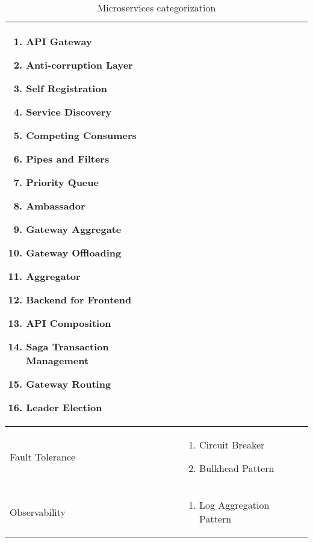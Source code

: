 \documentclass[conference]{IEEEtran}
\begin{document}
\begin{center}
\begin{table}[h]
\begin{tabular}{ | m{3cm} | m{12cm} | }
        \vspace*{10px}
        \begin{enumerate}
            \item API Gateway
            \item Anti-corruption Layer
            \item Self Registration
            \item Service Discovery
            \item Competing Consumers
            \item Pipes and Filters
            \item Priority Queue
            \item Ambassador
            \item Gateway Aggregate
            \item Gateway Offloading
            \item Aggregator
            \item Backend for Frontend
            \item API Composition
            \item Saga Transaction Management
            \item Gateway Routing
            \item Leader Election
        \end{enumerate} 
        
        
 
        \\

        \hline

        Fault Tolerance &
        
        \vspace*{10px}
        \begin{enumerate}
            \item Circuit Breaker
            \item Bulkhead Pattern
        \end{enumerate} 
 
        \\
        \hline

        Observability & 
        
        \vspace*{10px}
        \begin{enumerate}
            \item  Log Aggregation Pattern
        \end{enumerate} 
       
 
        \\
        \hline


    \end{tabular}
    \caption{Microservices categorization}
    \label{microservices-categorization}
    \end{table}
\end{center}
\end{document}
